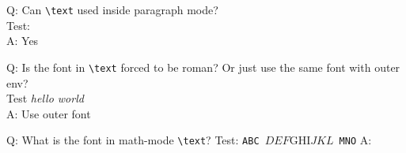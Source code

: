 \documentclass[11pt]{revtex4-1}
\begin{document}
\noindent
Q: Can \verb+\text+ used inside paragraph mode? \\
Test:  \\
A: Yes

\noindent
Q: Is the font in \verb+\text+ forced to be roman? Or just use the same font with outer env? \\
Test \textit{hello  world} \\
A: Use outer font

\noindent
Q: What is the font in math-mode \verb+\text+?
Test: \texttt{ABC $DEF \text{GHI} JKL$ MNO}
A:
\end{document}
